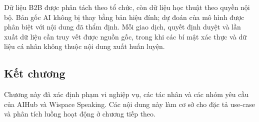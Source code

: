 Dữ liệu B2B được phân tách theo tổ chức, còn dữ liệu học thuật theo quyền nội bộ. Bản gốc AI không bị thay bằng bản hiệu đính; dự đoán của mô hình được phân biệt với nội dung đã thẩm định. Mỗi giao dịch, quyết định duyệt và lần xuất dữ liệu cần truy vết được nguồn gốc, trong khi các bí mật xác thực và dữ liệu cá nhân không thuộc nội dung xuất huấn luyện.

\subsection*{Kết chương}
Chương này đã xác định phạm vi nghiệp vụ, các tác nhân và các nhóm yêu cầu của AIHub và Wispace Speaking. Các nội dung này làm cơ sở cho đặc tả use-case và phân tích luồng hoạt động ở chương tiếp theo.
